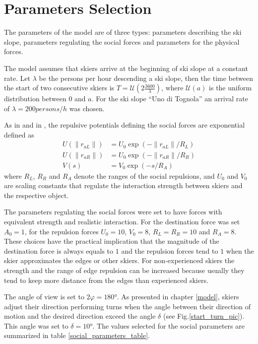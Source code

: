 \documentclass[12pt,a4paper,twoside]{book}
\newcommand{\norm}[1]{\lVert#1\rVert}
\begin{document}
\section{Parameters Selection}
The parameters of the model are of three types: parameters describing the ski slope, parameters regulating the social forces and parameters for the physical forces.

The model assumes that skiers arrive at the beginning of ski slope at a constant rate. Let $\lambda$ be the persons per hour descending a ski slope, then the time between the start of two consecutive skiers is $T=\mathcal{U}\left(2\frac{3600}{\lambda}\right)$, where $\mathcal{U}(a)$ is the uniform distribution between $0$ and $a$. For the ski slope ``Uno di Tognola'' an arrival rate of $\lambda=200 persons/h$ was chosen.

As in \cite{hol2012} and in \cite{hel2008}, the repulsive potentials defining the social forces are exponential defined as
\begin{align}
U(\norm{r_{aL}})&=U_0 \exp(-\norm{r_{aL}}/R_L) \\
U(\norm{r_{aR}})&=U_0 \exp(-\norm{r_{aR}}/R_R) \\
V(s)&=V_0 \exp(-s/R_A)
\end{align}
where $R_L$, $R_R$ and $R_A$ denote the ranges of the social repulsions, and $U_0$ and $V_0$ are scaling constants that regulate the interaction strength between skiers and the respective object.

The parameters regulating the social forces were set to have forces with equivalent strength and realistic interaction. For the destination force was set $A_0=1$, for the repulsion forces $U_0=10$, $V_0=8$, $R_L=R_R=10$ and $R_A=8$. These choices have the practical implication that the magnitude of the destination force is always equals to $1$ and the repulsion forces tend to $1$ when the skier approximates the edges or other skiers. For non-experienced skiers the strength and the range of edge repulsion can be increased because usually they tend to keep more distance from the edges than experienced skiers.

 The angle of view is set to $2\varphi=180°$. As presented in chapter \ref{model}, skiers adjust their direction performing turns when the angle between their direction of motion and the desired direction exceed the angle $\delta$ (see Fig.\ref{start_turn_pic}). This angle was set to $\delta=10°$. The values selected for the social parameters are summarized in table \ref{social_parameters_table}.
\end{document}
